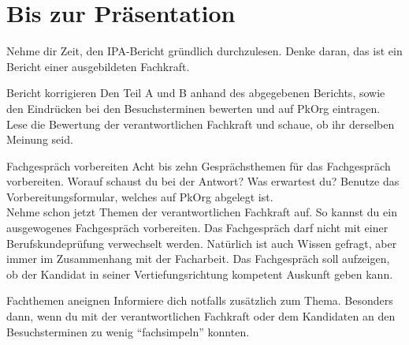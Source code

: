 \section{Bis zur Präsentation}
Nehme dir Zeit, den IPA-Bericht gründlich durchzulesen. Denke daran, das ist ein Bericht einer ausgebildeten Fachkraft.

\begin{taskitemwithoutcomment}{Bericht korrigieren}
  Den Teil A und B anhand des abgegebenen Berichts, sowie den Eindrücken bei den Besuchsterminen bewerten und auf PkOrg eintragen. Lese die Bewertung der verantwortlichen Fachkraft und schaue, ob ihr derselben Meinung seid.
\end{taskitemwithoutcomment}
\begin{taskitemwithoutcomment}{Fachgespräch vorbereiten}
  Acht bis zehn Gesprächsthemen für das Fachgespräch vorbereiten. Worauf schaust du bei der Antwort? Was erwartest du? Benutze das Vorbereitungsformular, welches auf PkOrg abgelegt ist.\\ Nehme schon jetzt Themen der verantwortlichen Fachkraft auf. So kannst du ein ausgewogenes Fachgespräch vorbereiten. Das Fachgespräch darf nicht mit einer Berufskundeprüfung verwechselt werden. Natürlich ist auch Wissen gefragt, aber immer im Zusammenhang mit der Facharbeit. Das Fachgespräch soll aufzeigen, ob der Kandidat in seiner Vertiefungsrichtung kompetent Auskunft geben kann.
\end{taskitemwithoutcomment}
\begin{taskitem}{Fachthemen aneignen}
  Informiere dich notfalls zusätzlich zum Thema. Besonders dann, wenn du mit der verantwortlichen Fachkraft oder dem Kandidaten an den Besuchsterminen zu wenig \enquote{fachsimpeln} konnten.
\end{taskitem}

